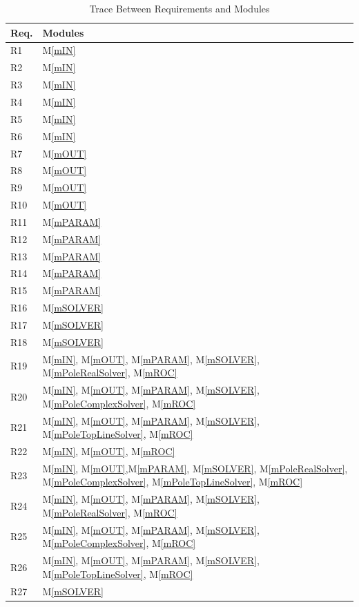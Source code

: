 \documentclass[12pt, titlepage]{article}
\newcommand{\mref}[1]{M\ref{#1}}
\begin{document}
\begin{table}[H]
\centering
\begin{tabular}{p{} p{}}
\toprule
\textbf{Req.} & \textbf{Modules}\\
\midrule
  R1  & \mref{mIN}\\
  R2  & \mref{mIN}\\
  R3  & \mref{mIN}\\
  R4  & \mref{mIN}\\
  R5  & \mref{mIN}\\
  R6  & \mref{mIN}\\
  R7  & \mref{mOUT}\\
  R8  & \mref{mOUT}\\
  R9  & \mref{mOUT}\\
  R10 & \mref{mOUT}\\
  R11 & \mref{mPARAM}\\
  R12 & \mref{mPARAM}\\
  R13 & \mref{mPARAM}\\
  R14 & \mref{mPARAM}\\
  R15 & \mref{mPARAM}\\
  R16 & \mref{mSOLVER}\\
  R17 & \mref{mSOLVER}\\
  R18 & \mref{mSOLVER}\\
  R19 & \mref{mIN}, \mref{mOUT}, \mref{mPARAM}, \mref{mSOLVER}, \mref{mPoleRealSolver}, \mref{mROC}\\
  R20 & \mref{mIN}, \mref{mOUT}, \mref{mPARAM}, \mref{mSOLVER}, \mref{mPoleComplexSolver}, \mref{mROC}\\
  R21 & \mref{mIN}, \mref{mOUT}, \mref{mPARAM}, \mref{mSOLVER}, \mref{mPoleTopLineSolver}, \mref{mROC}\\
  R22 & \mref{mIN}, \mref{mOUT}, \mref{mROC}\\
  R23 & \mref{mIN}, \mref{mOUT},\mref{mPARAM}, \mref{mSOLVER}, \mref{mPoleRealSolver}, \mref{mPoleComplexSolver}, \mref{mPoleTopLineSolver}, \mref{mROC}\\
  R24 & \mref{mIN}, \mref{mOUT}, \mref{mPARAM}, \mref{mSOLVER}, \mref{mPoleRealSolver}, \mref{mROC}\\
  R25 & \mref{mIN}, \mref{mOUT}, \mref{mPARAM}, \mref{mSOLVER}, \mref{mPoleComplexSolver}, \mref{mROC}\\
  R26 & \mref{mIN}, \mref{mOUT}, \mref{mPARAM}, \mref{mSOLVER}, \mref{mPoleTopLineSolver}, \mref{mROC}\\
  R27 & \mref{mSOLVER}\\
\bottomrule
\end{tabular}
\caption{Trace Between Requirements and Modules}
\label{tb:TblRT}
\end{table}
\end{document}
